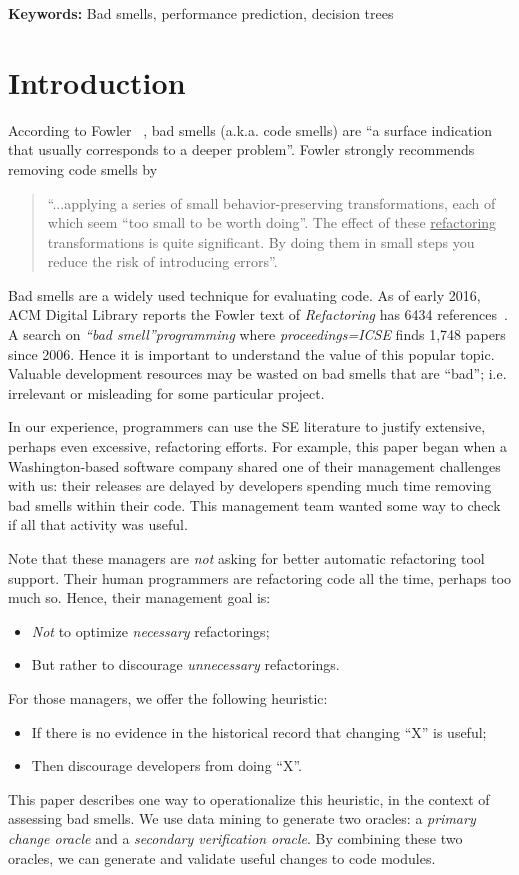 \documentclass[twocolumn,5p]{elsarticle}
\newcommand{\bi}{\begin{itemize}[leftmargin=0.4cm]}
\newcommand{\ei}{\end{itemize}}
\theoremstyle{break}
\begin{document}
\vspace{1mm}
\noindent
{\bf Keywords:} Bad smells,
performance prediction,  decision trees 




\section{Introduction}

According to   Fowler ~\cite{fowler99}, bad smells (a.k.a. code smells)
are ``a surface indication that usually corresponds to a deeper problem''.
Fowler strongly recommends   removing   code smells   by
\begin{quote}
``...applying a series of small behavior-preserving transformations, each 
of which seem ``too small to be worth doing''. 
The  effect of   these \underline{refactoring} transformations is quite significant. By doing them in small steps you reduce the risk 
of introducing errors''.
\end{quote}
Bad smells are a widely used technique for evaluating code. As of  early 2016, ACM Digital Library reports 
the Fowler text of {\em Refactoring} has 6434 references~\cite{fowler99}. A search  on {\em ``bad smell''programming} 
where {\em proceedings=ICSE} finds 1,748 papers since 2006.
Hence it is important to understand the value of
this popular topic.  
Valuable development resources may be wasted on bad smells that are ``bad''; i.e. 
 irrelevant or misleading
for some particular project.

In our experience, programmers can use the SE literature to justify extensive, perhaps even excessive, refactoring efforts.
For example, this paper began when a Washington-based software company shared
one of their management challenges with us: their  releases are delayed by developers spending  much time removing bad smells within their code. This management team wanted some way to check if all that activity was useful.
 
Note that these managers are {\em not} asking for better
automatic refactoring
tool support. Their human programmers are refactoring
code all the time, perhaps too much so.
Hence, their management goal is: 
\bi
\item
{\em Not} to optimize {\em necessary} refactorings;
\item
But rather to discourage {\em unnecessary} refactorings.
\ei
For those managers, we offer the  following heuristic:
\bi
\item If there is no evidence in the historical record that changing ``X'' is useful;
\item Then discourage developers from doing ``X''.
\ei
This paper describes one way to operationalize this heuristic, in the context
of assessing bad smells. We use data mining to generate two oracles: a {\em primary
change oracle} and a {\em secondary verification oracle}.
By combining these two oracles,
 we can generate and validate useful
changes to code modules.
\end{document}
